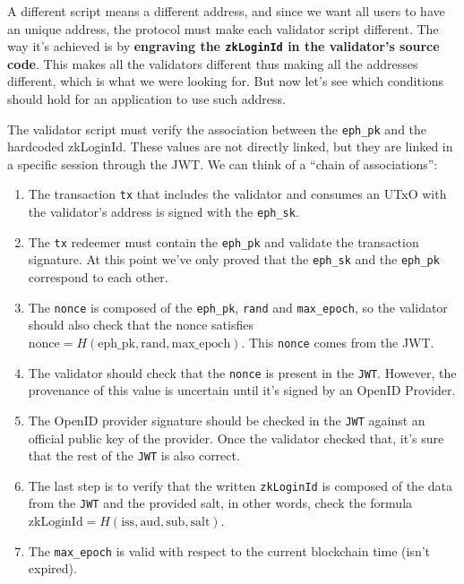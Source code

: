 \documentclass{article}
\begin{document}
A different script means a different address, and since we want all users to have an unique address, the protocol must make each validator script different. The way it's achieved is by \textbf{engraving the \texttt{zkLoginId} in the validator's source code}. This makes all the validators different thus making all the addresses different, which is what we were looking for. But now let's see which conditions should hold for an application to use such address.

The validator script must verify the association between the \texttt{eph\_pk} and the hardcoded zkLoginId. These values are not directly linked, but they are linked in a specific session through the JWT. We can think of a “chain of associations'':

\begin{enumerate}
    \item The transaction \texttt{tx} that includes the validator and consumes an UTxO with the validator's address is signed with the \texttt{eph\_sk}.
    \item The \texttt{tx} redeemer must contain the \texttt{eph\_pk} and validate the transaction signature. At this point we've only proved that the \texttt{eph\_sk} and the \texttt{eph\_pk} correspond to each other.
    \item The \texttt{nonce} is composed of the \texttt{eph\_pk}, \texttt{rand} and \texttt{max\_epoch}, so the validator should also check that the nonce satisfies $\text{nonce} = H(\text{eph\_pk}, \text{rand}, \text{max\_epoch})$. This \texttt{nonce} comes from the JWT.
    \item The validator should check that the \texttt{nonce} is present in the \texttt{JWT}. However, the provenance of this value is uncertain until it's signed by an OpenID Provider.
    \item The OpenID provider signature should be checked in the \texttt{JWT} against an official public key of the provider. Once the validator checked that, it's sure that the rest of the \texttt{JWT} is also correct.
    \item The last step is to verify that the written \texttt{zkLoginId} is composed of the data from the \texttt{JWT} and the provided salt, in other words, check the formula $\text{zkLoginId} = H(\text{iss}, \text{aud}, \text{sub}, \text{salt})$.
    \item The \texttt{max\_epoch} is valid with respect to the current blockchain time (isn't expired).
\end{enumerate}
\end{document}
